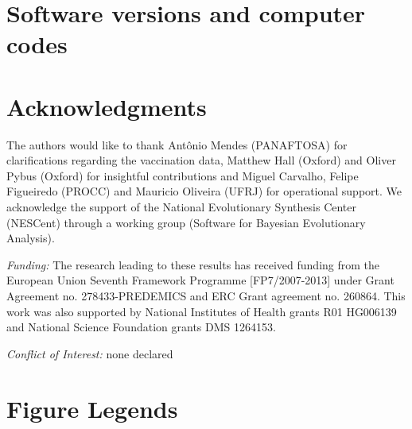 \documentclass[10pt]{article}
\begin{document}
\section{Software versions and computer codes}

\section*{Acknowledgments}
The authors would like to thank Ant\^onio Mendes (PANAFTOSA) for clarifications regarding the vaccination data, Matthew Hall (Oxford) and Oliver Pybus (Oxford) for insightful contributions and Miguel Carvalho, Felipe Figueiredo (PROCC) and Mauricio Oliveira (UFRJ) for operational support.
We acknowledge the support of the National Evolutionary Synthesis Center (NESCent) through a working group (Software for Bayesian Evolutionary Analysis).

\emph{Funding:} The research leading to these results has received funding from the European Union Seventh Framework Programme [FP7/2007-2013] under Grant Agreement no. 278433-PREDEMICS and ERC Grant agreement no. 260864.
This work was also supported by National Institutes of Health grants R01 HG006139 and National Science Foundation grants DMS 1264153.

\emph{Conflict of Interest:} none declared

\newpage

\section*{Figure Legends}
\newpage
\end{document}
